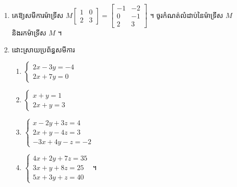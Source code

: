 \begin{enumerate}[1]
\begin{enumerate}[a]
    \item $\begin{bmatrix} 4 & -3\\ 2 & -1 \end{bmatrix}\begin{bmatrix} a\\ -1 \end{bmatrix} = \begin{bmatrix} 15\\ b \end{bmatrix}$
    \item $\begin{bmatrix} -1 & a\\ b & 1 \end{bmatrix}\begin{bmatrix} 2 & -1\\ -1 & 2 \end{bmatrix} = \begin{bmatrix} 1 & 5\\ 3 & 0 \end{bmatrix}$ ។
  \end{enumerate}
  \item គេឱ្យសមីការម៉ាទ្រីស $M\begin{bmatrix} 1 & 0\\ 2 & 3 \end{bmatrix} = \begin{bmatrix} -1 & -2\\ 0 & -1\\ 2 & 3 \end{bmatrix}$ ។ ចូរកំណត់លំដាប់នៃម៉ាទ្រីស $M$ និងរកម៉ាទ្រីស $M$ ។
  \item ដោះស្រាយប្រព័ន្ធសមីការ
  \begin{enumerate}[a]
    \item $\begin{cases} 2x - 3y = -4\\ 2x + 7y = 0 \end{cases}$
    \item $\begin{cases} x + y = 1\\ 2x + y = 3 \end{cases}$
    \item $\begin{cases} x - 2y + 3z = 4\\ 2x + y - 4z = 3\\ -3x + 4y - z = -2 \end{cases}$
    \item $\begin{cases} 4x + 2y + 7z = 35\\ 3x + y + 8z = 25\\ 5x + 3y + z = 40 \end{cases}$ ។

\end{enumerate}
\end{enumerate}
